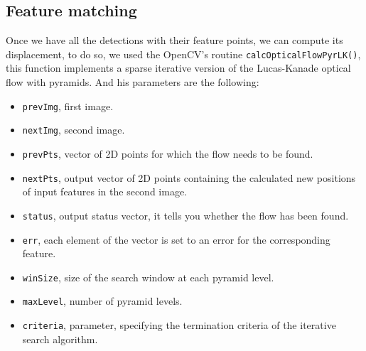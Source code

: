  

\subsection{Feature matching}


Once we have all the detections with their feature points, we can compute its displacement, to do so,  we used the OpenCV's routine \texttt{calcOpticalFlowPyrLK()}, this function implements a sparse iterative version of the Lucas-Kanade optical flow with pyramids. And his parameters are the following:
 
\begin{itemize}

\item \texttt{prevImg}, first image.
\item \texttt{nextImg}, second image.
\item \texttt{prevPts}, vector of 2D points for which the flow needs to be found. 
\item \texttt{nextPts}, output vector of 2D points containing the calculated new positions of input features in the second image. 
\item \texttt{status}, output status vector, it tells you whether the flow has been found.  
\item \texttt{err}, each element of the vector is set to an error for the corresponding feature.
\item \texttt{winSize}, size of the search window at each pyramid level. 
\item \texttt{maxLevel}, number of pyramid levels.  
\item \texttt{criteria}, parameter, specifying the termination criteria of the iterative search algorithm.
\end{itemize}



